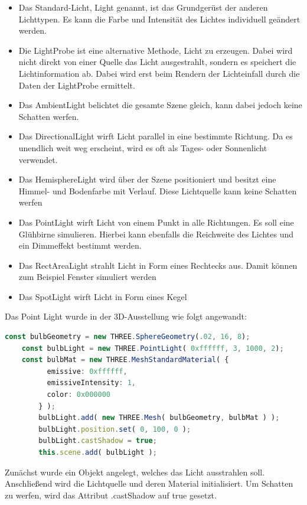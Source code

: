 \begin{itemize}
    \item Das Standard-Licht, Light genannt, ist das Grundgerüst der anderen Lichttypen. Es kann die Farbe und Intensität des Lichtes individuell geändert werden. \cite{StandardLight}
    \item Die LightProbe ist eine alternative Methode, Licht zu erzeugen. Dabei wird nicht direkt von einer Quelle das Licht ausgestrahlt, sondern es speichert die Lichtinformation ab. Dabei wird erst beim Rendern der Lichteinfall durch die Daten der LightProbe ermittelt.  \cite{LightProbe}
    \item Das AmbientLight belichtet die gesamte Szene gleich, kann dabei jedoch keine Schatten werfen. \cite{AmbientLight}
    \item Das DirectionalLight wirft Licht parallel in eine bestimmte Richtung. Da es unendlich weit weg erscheint, wird es oft als Tages- oder Sonnenlicht verwendet. \cite{DirectionalLight}
    \item Das HemisphereLight wird über der Szene positioniert und besitzt eine Himmel- und Bodenfarbe mit Verlauf. Diese Lichtquelle kann keine Schatten werfen \cite{HemisphereLight}
    \item Das PointLight wirft Licht von einem Punkt in alle Richtungen. Es soll eine Glühbirne simulieren. Hierbei kann ebenfalls die Reichweite des Lichtes und ein Dimmeffekt bestimmt werden. \cite{PointLight}
    \item Das RectAreaLight strahlt Licht in Form eines Rechtecks aus. Damit können zum Beispiel Fenster simuliert werden \cite{ReactAreaLight}
    \item Das SpotLight wirft Licht in Form eines Kegel \cite{SpotLight}
\end{itemize}

Das Point Light wurde in der 3D-Ausstellung wie folgt angewandt:  
\begin{lstlisting}[caption={Lichtsetzung in der 3D-Ausstellung},language=TypeScript,label=lst:impl:pointlight]
    const bulbGeometry = new THREE.SphereGeometry(.02, 16, 8);
    const bulbLight = new THREE.PointLight( 0xffffff, 3, 1000, 2); 
    const bulbMat = new THREE.MeshStandardMaterial( {
          emissive: 0xffffff,
          emissiveIntensity: 1,
          color: 0x000000
        } );
        bulbLight.add( new THREE.Mesh( bulbGeometry, bulbMat ) );
        bulbLight.position.set( 0, 100, 0 );
        bulbLight.castShadow = true;
        this.scene.add( bulbLight );
\end{lstlisting}
Zunächst wurde ein Objekt angelegt, welches das Licht ausstrahlen soll. Anschließend wird die Lichtquelle und deren Material initialisiert. Um Schatten zu werfen, wird das Attribut .castShadow auf true gesetzt. 

